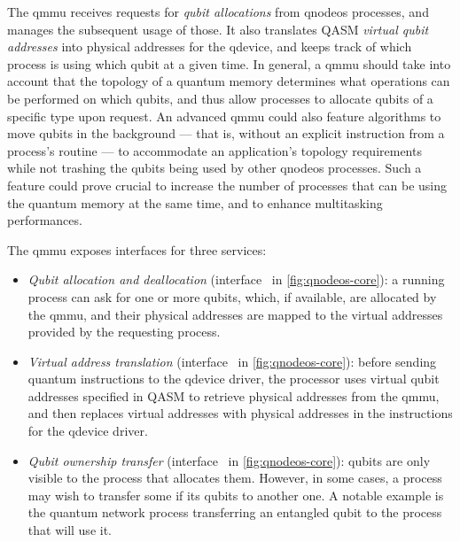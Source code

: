 The \acrfull{qmmu} receives requests for \emph{qubit allocations} from \acrshort{qnodeos} processes,
and manages the subsequent usage of those. It also translates QASM \emph{virtual qubit addresses}
into physical addresses for the \acrshort{qdevice}, and keeps track of which process is using which
qubit at a given time. In general, a \acrshort{qmmu} should take into account that the topology of a
quantum memory determines what operations can be performed on which qubits, and thus allow processes
to allocate qubits of a specific type upon request. An advanced \acrshort{qmmu} could also feature
algorithms to move qubits in the background --- that is, without an explicit instruction from a
process's routine --- to accommodate an application's topology requirements while not trashing the
qubits being used by other \acrshort{qnodeos} processes. Such a feature could prove crucial to
increase the number of processes that can be using the quantum memory at the same time, and to
enhance multitasking performances.

The \acrshort{qmmu} exposes interfaces for three services:
\begin{itemize}
    \item \emph{Qubit allocation and deallocation} (interface~ in
          \cref{fig:qnodeos-core}): a running process can ask for one or more qubits, which, if
          available, are allocated by the \acrshort{qmmu}, and their physical addresses are mapped
          to the virtual addresses provided by the requesting process.
    \item \emph{Virtual address translation} (interface~ in \cref{fig:qnodeos-core}):
          before sending quantum instructions to the \acrshort{qdevice} driver, the processor uses
          virtual qubit addresses specified in QASM to retrieve physical addresses from the
          \acrshort{qmmu}, and then replaces virtual addresses with physical addresses in the
          instructions for the \acrshort{qdevice} driver.
    \item \emph{Qubit ownership transfer} (interface~ in \cref{fig:qnodeos-core}):
          qubits are only visible to the process that allocates them. However, in some cases, a
          process may wish to transfer some if its qubits to another one. A notable example is the
          quantum network process transferring an entangled qubit to the process that will use it.
\end{itemize}

\begin{xstretch}
\printbibliography[heading=subbibintoc,title={References},notcategory=noprint]
\end{xstretch}
